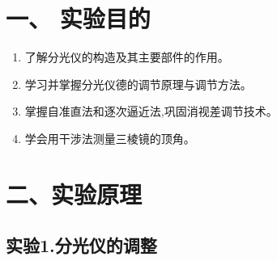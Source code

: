 \section*{一、 实验目的}
\begin{enumerate}
\item 了解分光仪的构造及其主要部件的作用。
\item 学习并掌握分光仪德的调节原理与调节方法。
\item 掌握自准直法和逐次逼近法,巩固消视差调节技术。
\item 学会用干涉法测量三棱镜的顶角。
\end{enumerate}

\section*{二、实验原理}
\subsection*{实验1.分光仪的调整}
